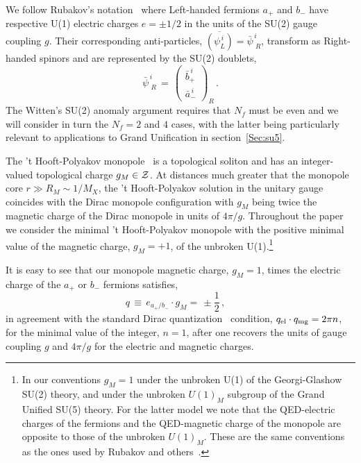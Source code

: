\documentclass[a4paper,11pt]{article}
\begin{document}
We follow Rubakov's notation~\cite{Rubakov:1988aq} where Left-handed fermions $a_{+}$ and $b_{-}$ have respective U(1) electric charges $e =\pm 1/2$ in the units of the SU(2) gauge coupling $g$.
Their corresponding anti-particles, $\overline{(\psi_L^{\,i})} = \bar\psi_{\,\,R}^{\,i}$, transform as Right-handed spinors and are represented by the SU(2) doublets,
\begin{equation}
\label{eq:barferm_ab}
\bar\psi_{\,\,R}^{\,i}\,=\, \begin{pmatrix}
\bar{b}_{+}^{\,i}  \\
\bar{a}_{-}^{\,i}
\end{pmatrix}_R\,.
\end{equation}
The Witten's SU(2) anomaly argument requires that $N_f$ must be even and we will consider in turn the $N_f=2$ and $4$ cases, with the latter being particularly relevant to applications to Grand Unification in section~\ref{Sec:su5}.

The 't Hooft-Polyakov monopole~\cite{tHooft:1974kcl,Polyakov:1974ek} is a topological soliton and has an integer-valued topological charge $g_M \in {\cal Z}$. At distances much greater that the monopole core $r \gg R_M  \sim 1/M_X$, the 't Hooft-Polyakov solution in the unitary gauge coincides with the Dirac monopole configuration with $g_M$ being twice the magnetic charge of the Dirac monopole in units of $4\pi/g$.
Throughout the paper we consider the minimal 't Hooft-Polyakov monopole with the positive minimal value of the magnetic charge, $g_M= + 1$,
of the unbroken U(1).\footnote{In our conventions $g_M=1$ under the unbroken U(1) of the Georgi-Glashow SU(2) theory, and under the unbroken $U(1)_M$ subgroup of the Grand Unified SU(5) theory. For the latter model we note 
that the QED-electric charges of the fermions and the QED-magnetic charge of the monopole are opposite to those of the unbroken $U(1)_M$. These are the same conventions as the ones used by Rubakov and others~\cite{Rubakov:1981rg,Rubakov:1988aq,Preskill:1984gd}.}

It is easy to see that our monopole magnetic charge, $g_M=1$, times the electric charge of the $a_{+}$ or $b_{-}$ fermions satisfies,
\begin{equation}
\label{eq:qdef}
q\, \equiv\, e_{a_+/b_-} \cdot g_M =\, \pm \frac{1}{2} \,, \quad 
\end{equation}
in agreement with the standard Dirac quantization~\cite{Dirac:1931kp} condition, $q_{\rm el} \cdot q_{\rm mg} = 2 \pi n$, for the minimal value of the integer, $n=1$, after one recovers the units of gauge coupling $g$ and $4\pi/g$ for the electric and magnetic charges.
\end{document}
